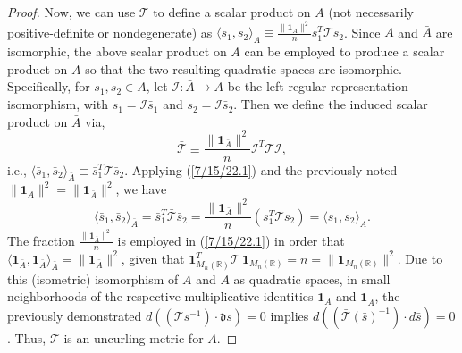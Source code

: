 \documentclass{amsart}
\numberwithin{equation}{section}
\theoremstyle{definition}
\numberwithin{theorem}{section}
\begin{document}
\begin{proof}
   Now, we can use $\mathcal{\mathcal{T}}$ to define a scalar product on $A$ (not necessarily positive-definite or nondegenerate) as $\langle s_1,s_2\rangle_A \equiv  \frac{\|\mathbf{1}_{A}\|^2}{n}s_1^T \mathcal{\mathcal{T}} s_2$. 
    Since $A$ and $\bar{A}$ are isomorphic, the above scalar product on $A$ can be employed to produce a scalar product on $\bar{A}$ so that the two resulting quadratic spaces are isomorphic.  Specifically,  for $s_1,s_2\in A$, let $ \mathcal{I}:\bar{A}\rightarrow A$ be the left regular representation isomorphism, with $s_1 = \mathcal{I}\bar{s}_1$ and $s_2= \mathcal{I}\bar{s}_2 $.  Then we define the induced scalar product on $\bar{A}$ via, \begin{equation}\label{7/15/22.1} \bar{\mathcal{\mathcal{T}}} \equiv  \frac{\|\mathbf{1}_{\bar{A}}\|^2}{n}\mathcal{I}^T\mathcal{\mathcal{T}}\mathcal{I},\end{equation} i.e., $\langle \bar{s}_1,\bar{s}_2\rangle_{\bar{A}} \equiv \bar{s}_1^T \bar{\mathcal{\mathcal{T}}} \bar{s}_2$.  Applying (\ref{7/15/22.1}) and the previously noted $\|\mathbf{1}_A\|^2 = \|\mathbf{1}_{\bar{A}}\|^2$, we have \begin{equation}\label{8/25/22.1} \langle \bar{s}_1,\bar{s}_2\rangle_{\bar{A}} = \bar{s}_1^T \bar{\mathcal{T}} \bar{s}_2 = \frac{\|\mathbf{1}_{\bar{A}}\|^2}{n}( s_1^T \mathcal{T} s_2) = \langle s_1,s_2\rangle_{A}.\end{equation}  The fraction $\frac{\|\mathbf{1}_{\bar{A}}\|^2}{n}$ is employed in (\ref{7/15/22.1}) in order that $\langle \mathbf{1}_{\bar{A}},\mathbf{1}_{\bar{A}}\rangle_{\bar{A}} = \|\mathbf{1}_{\bar{A}}\|^2$, given that $\mathbf{1}_{M_n(\mathbb{R})}^T \mathcal{T}\,\mathbf{1}_{M_n(\mathbb{R})} = n = \|\mathbf{1}_{M_n(\mathbb{R})}\|^2$. Due to this (isometric) isomorphism of $A$ and $\bar{A}$ as quadratic spaces,  in small neighborhoods of the respective multiplicative identities $\mathbf{1}_A$ and $\mathbf{1}_{\bar{A}}$, the previously demonstrated $d((\mathcal{T}s^{-1})\cdot \mathfrak{d}s) = 0$ implies 
\mbox{$d((\bar{\mathcal{T}}(\bar{s})^{-1})\cdot d\bar{s}) = 0$.} Thus, $\bar{\mathcal{T}}$ is an uncurling metric for $\bar{A}$.



\end{proof}
\end{document}
